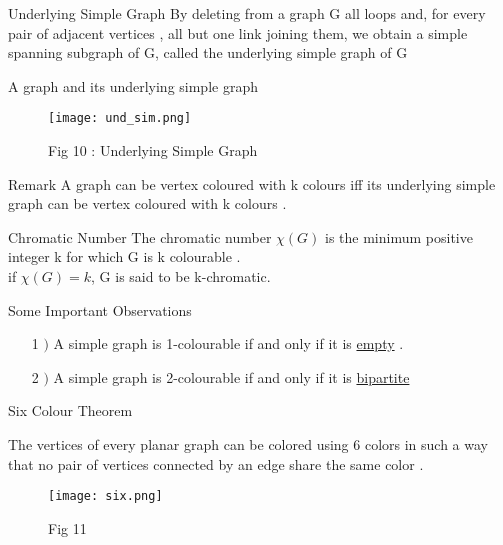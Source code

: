 \documentclass[12pt]{beamer}
\begin{document}
\begin{frame}
\begin{block}{Underlying Simple Graph}
By deleting from a graph G all loops and, for every pair of adjacent vertices , all but one link joining them, we obtain a simple spanning subgraph of G, called the underlying simple graph of G
\end{block}
\end{frame}

\begin{frame}{A graph and its underlying simple graph}
\begin{figure}
\texttt{[image: und\_sim.png]}
\caption{Fig 10 : Underlying Simple Graph}
\end{figure}
\end{frame}


\begin{frame}
\begin{block}{Remark}
A graph can be vertex coloured with k colours iff its underlying simple graph can be vertex coloured with k colours .
\end{block}
\end{frame}

\begin{frame}{Chromatic Number}
The chromatic number $\chi(G)$
is the minimum positive integer k for which G is k colourable .\\

if $\chi(G) = k $, G is said to be
k-chromatic.
\end{frame}

\begin{frame}{Some Important Observations}
\begin{itemize}
\item[1] $)$ A simple graph is 1-colourable if and only if it is \hyperlink{page.5}{empty}  .
\item[2] $)$ A simple graph is 2-colourable if and only if it is \hyperlink{page.9}{bipartite} 
\end{itemize}
\end{frame}

\begin{frame}{Six Colour Theorem}
\begin{large}
The vertices of every planar graph can be colored using 6 colors
in such a way that no pair of vertices connected by an edge share the same color . 
\end{large}
\begin{figure}
\texttt{[image: six.png]}
\caption{Fig 11}
\end{figure}
\end{frame}
\end{document}
